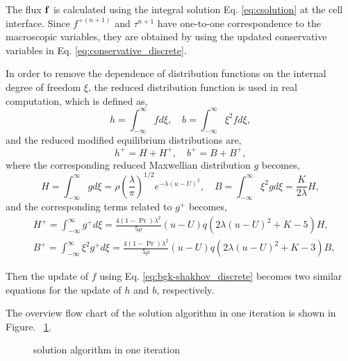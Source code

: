 \documentclass[a4paper]{book}
\begin{document}
The flux ${\bf f}$ is calculated using the integral solution Eq. \ref{eq:csolution} at the cell interface. Since $f^{+(n+1)}$ and $\tau^{n+1}$ have one-to-one correspondence to the macroscopic variables, they are obtained by using the updated conservative variables in Eq. \ref{eq:conservative_discrete}.

In order to remove the dependence of distribution functions on the internal degree of freedom $\xi$, the reduced distribution function \cite{Yang1995,Chu1965} is used in real computation, which is defined as,
\begin{equation} 
    h = \int_{-\infty}^{\infty}fd\xi,\quad b = \int_{-\infty}^{\infty}\xi^2 f d\xi,
\end{equation} 
and the reduced modified equilibrium distributions are,
$$h^+ = H+H^+,\quad b^+ = B+B^+,$$
where the corresponding reduced Maxwellian distribution $g$ becomes,
\begin{equation} 
    \label{eq:reduced_g}
    H = \int_{-\infty}^{\infty}gd\xi = \rho\left(\frac{\lambda}{\pi}\right)^{1/2}e^{-\lambda(u-U)^2},\quad B = \int_{-\infty}^{\infty}\xi^2 gd\xi =\frac{K}{2\lambda}H,
\end{equation}
and the corresponding terms related to $g^+$ becomes,
\begin{equation}
    \label{eq:reduced_gp}
    \begin{aligned}
        & H^+ = \int_{-\infty}^{\infty}g^+d\xi = \frac{4(1-\Pr)\lambda^2}{5\rho}(u-U)q(2\lambda(u-U)^2+K-5)H, \\
        & B^+ = \int_{-\infty}^{\infty}\xi^2g^+d\xi = \frac{4(1-\Pr)\lambda^2}{5\rho}(u-U)q(2\lambda(u-U)^2+K-3)B,
    \end{aligned}
\end{equation}

Then the update of $f$ using Eq. \ref{eq:bgk-shakhov_discrete} becomes two similar equations for the update of $h$ and $b$, respectively.

The overview flow chart of the solution algorithm in one iteration is shown in Figure. ~\ref{pic:solution}.

\begin{figure}[htb!]
    \centering
    \caption{solution algorithm in one iteration}
    \label{pic:solution}
\end{figure}
\end{document}
